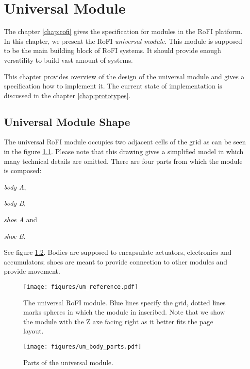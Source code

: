 \chapter{Universal Module}\label{chap:universal_module}

The chapter \ref{chap:rofi} gives the specification for modules in the RoFI
platform. In this chapter, we present the RoFI \emph{universal module}. This
module is supposed to be the main building block of RoFI systems. It should
provide enough versatility to build vast amount of systems.

This chapter provides overview of the design of the universal module and gives a
specification how to implement it. The current state of implementation is
discussed in the chapter \ref{chap:prototypes}.

\section{Universal Module Shape}

The universal RoFI module occupies two adjacent cells of the grid as can be
seen in the figure \ref{fig:um_reference}. Please note that this drawing gives
a simplified model in which many technical details are omitted. There are four
parts from which the module is composed:
\begin{enumerate*}
    \item \emph{body A},
    \item \emph{body B},
    \item \emph{shoe A} and
    \item \emph{shoe B}.
\end{enumerate*}
See figure \ref{fig:um_body_parts}. Bodies are supposed to encapsulate
actuators, electronics and accumulators; shoes are meant to provide connection
to other modules and provide movement.

\begin{figure}
    \centering
    \texttt{[image: figures/um\_reference.pdf]}
    \caption{The universal RoFI module. Blue lines specify the grid, dotted
    lines marks spheres in which the module in inscribed. Note that we show the
    module with the Z axe facing right as it better fits  the page layout. }
    \label{fig:um_reference}
\end{figure}

\begin{figure}
    \centering
    \texttt{[image: figures/um\_body\_parts.pdf]}
    \caption{Parts of the universal module.}
    \label{fig:um_body_parts}
\end{figure}

